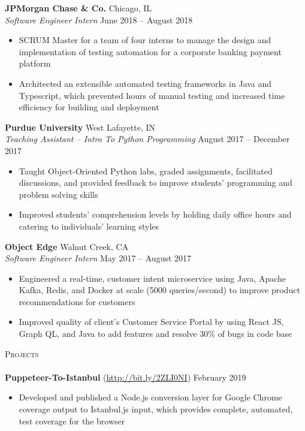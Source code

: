 \documentclass[letterpaper, 10pt]{article}
\newcommand{\lineunder} {
    \vspace*{-8pt} \\
    \hspace*{-18pt} \hrulefill \\
}
\newcommand{\header} [1] {
    {
        \hspace*{-18pt}\vspace*{6pt}
        {\large\textsc{#1}}
    }
    \vspace*{-6pt} \lineunder
}
\begin{document}
\textbf{JPMorgan Chase \& Co.} \hfill Chicago, IL\\
\textit{Software Engineer Intern} \hfill June 2018 -- August 2018\\
\vspace{-1mm}
\begin{itemize} \itemsep 1pt
	\item SCRUM Master for a team of four interns to manage the design and implementation of testing automation for a corporate banking payment platform
	\item Architected an extensible automated testing frameworks in Java and Typescript, which prevented hours of manual testing and increased time efficiency for building and deployment
\end{itemize}

\textbf{Purdue University} \hfill West Lafayette, IN\\
\textit{Teaching Assistant -- Intro To Python Programming} \hfill August 2017 – December 2017\\
\vspace{-1mm}
\begin{itemize} \itemsep 1pt
	\item Taught Object-Oriented Python labs, graded assignments, facilitated discussions, and provided feedback to improve students’ programming and problem solving skills
	\item Improved students’ comprehension levels by holding daily office hours and catering to individuals’ learning styles
\end{itemize}

\textbf{Object Edge} \hfill Walnut Creek, CA\\
\textit{Software Engineer Intern} \hfill May 2017 -- August 2017\\
\vspace{-1mm}
\begin{itemize} \itemsep 1pt
	\item Engineered a real-time, customer intent microservice using Java, Apache Kafka, Redis, and Docker at scale (5000 queries/second) to improve product recommendations for customers
	\item Improved quality of client’s Customer Service Portal by using React JS, Graph QL, and Java to add features and resolve 30\% of bugs in code base
\end{itemize}

\header{Projects}
{\textbf{Puppeteer-To-Istanbul}} (\href{http://bit.ly/2ZLI0NI}{http://bit.ly/2ZLI0NI}) \hfill February 2019\\
\vspace{-1mm}
\begin{itemize} \itemsep 1pt
	\item Developed and published a Node.js conversion layer for Google Chrome coverage output to Istanbul.js input, which provides complete, automated, test coverage for the browser
\end{itemize}
\vspace*{2mm}
\end{document}
